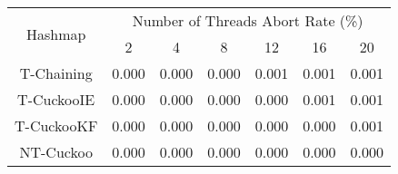 \begin{tabular}{|c|c|c|c|c|c|c|}
\hline
\multirow{2}{*}{Hashmap} & \multicolumn{6}{c|}{Number of Threads Abort Rate (\%)}\\\cline{2-7}& 2 & 4 & 8 & 12 & 16 & 20\\
\hline
\hline
T-Chaining & 0.000 & 0.000 & 0.000 & 0.001 & 0.001 & 0.001\\
T-CuckooIE & 0.000 & 0.000 & 0.000 & 0.000 & 0.001 & 0.001\\
T-CuckooKF & 0.000 & 0.000 & 0.000 & 0.000 & 0.000 & 0.001\\
NT-Cuckoo & 0.000 & 0.000 & 0.000 & 0.000 & 0.000 & 0.000\\
\hline
\end{tabular}
